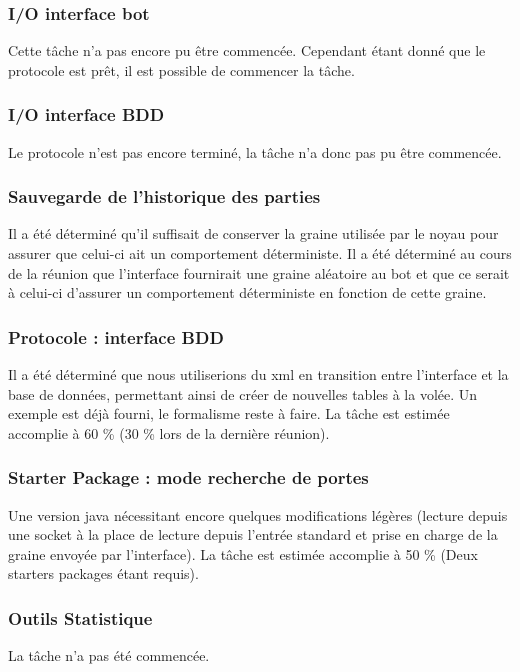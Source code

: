 \documentclass{article}
\begin{document}
\subsubsection*{I/O interface bot}
Cette tâche n'a pas encore pu être commencée. Cependant étant donné que le
protocole est prêt, il est possible de commencer la tâche.

\subsubsection*{I/O interface BDD}
Le protocole n'est pas encore terminé, la tâche n'a donc pas pu être
commencée.

\subsubsection*{Sauvegarde de l'historique des parties}
Il a été déterminé qu'il suffisait de conserver la graine utilisée par le
noyau pour assurer que celui-ci ait un comportement déterministe. Il a été
déterminé au cours de la réunion que l'interface fournirait une graine
aléatoire au bot et que ce serait à celui-ci d'assurer un comportement
déterministe en fonction de cette graine.

\subsubsection*{Protocole : interface BDD}
Il a été déterminé que nous utiliserions du xml en transition entre
l'interface et la base de données, permettant ainsi de créer de nouvelles
tables à la volée. Un exemple est déjà fourni, le formalisme reste à faire.
La tâche est estimée accomplie à 60 \% (30 \% lors de la dernière réunion).

\subsubsection*{Starter Package : mode recherche de portes}
Une version java nécessitant encore quelques modifications légères (lecture
depuis une socket à la place de lecture depuis l'entrée standard et prise en
charge de la graine envoyée par l'interface). La tâche est estimée accomplie
à 50 \% (Deux starters packages étant requis).

\subsubsection*{Outils Statistique}
La tâche n'a pas été commencée.
\end{document}
